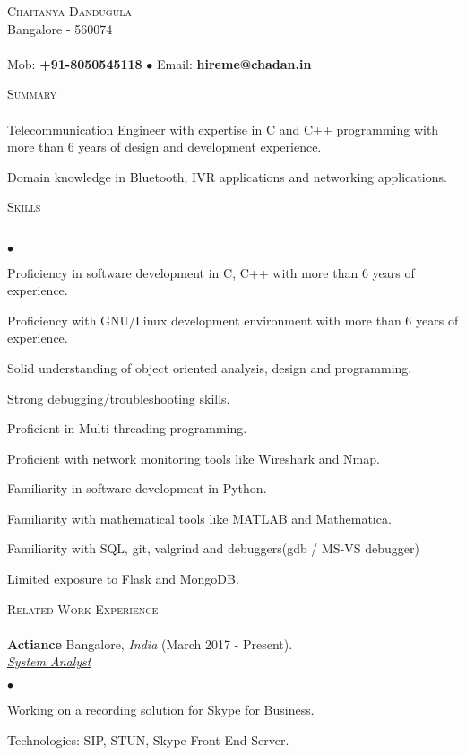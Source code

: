\documentclass[a4paper]{article}
\newcommand{\lineunder}{\vspace*{-8pt} \\ \hspace*{-18pt} \hrulefill \\}
\newcommand{\header}[1]{{\hspace*{-15pt}\vspace*{6pt} \textsc{#1}} \vspace*{-6pt} \lineunder}
\newcommand{\employer}[4]{{ \textbf{#1} #2  (#3).\\ \underline{\emph{#4}}\\  }}
\newcommand{\contact}[3]{
\vspace*{-8pt}
\begin{center}
{\LARGE \scshape {#1}}\\
#2 \lineunder
#3
\end{center}
\vspace*{-8pt}
}
\newenvironment{achievements}{\begin{list}{$\bullet$}{\topsep 0pt \itemsep -2pt}}{\vspace*{4pt}\end{list}}
\begin{document}
\small
\smallskip
\contact{Chaitanya Dandugula}
{Bangalore - 560074}
{Mob: \textbf{+91-8050545118} $\bullet$ Email: \textbf{hireme@chadan.in}}
\vspace*{5pt}

\header{Summary}
Telecommunication Engineer with expertise in C and C++ programming with more than 6 years of design and development experience.

Domain knowledge in Bluetooth, IVR applications and networking applications.

\header{Skills}
\begin{achievements}
\item Proficiency in software development in C, C++ with more than 6 years of experience.
\item Proficiency with GNU/Linux development environment with more than 6 years of experience.
\item Solid understanding of object oriented analysis, design and programming.
\item Strong debugging/troubleshooting skills.
\item Proficient in Multi-threading programming.
\item Proficient with network monitoring tools like Wireshark and Nmap.
\item Familiarity in software development in Python.
\item Familiarity with mathematical tools like MATLAB and Mathematica.
\item Familiarity with SQL, git, valgrind and debuggers(gdb / MS-VS debugger)
\item Limited exposure to Flask and MongoDB.
\end{achievements}

\header{Related Work Experience}
\employer{Actiance} {Bangalore, \textit{India}} {March 2017 - Present} {System Analyst}
	\begin{achievements}
  \item Working on a recording solution for Skype for Business.
	\item Technologies: SIP, STUN, Skype Front-End Server.
	\end{achievements}
\end{document}
